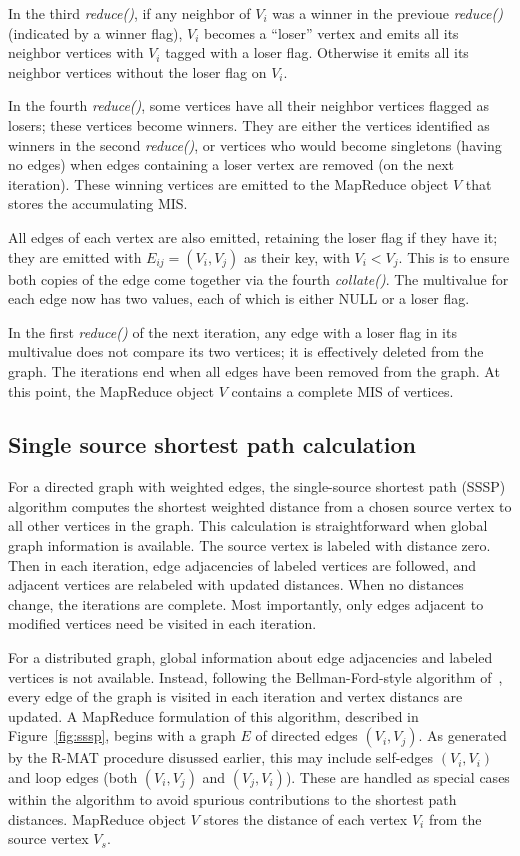 In the third {\it reduce()}, if any neighbor of $V_i$ was a winner in
the previoue {\it reduce()} (indicated by a winner flag), $V_i$
becomes a ``loser'' vertex and emits all its neighbor vertices with
$V_i$ tagged with a loser flag.  Otherwise it emits all its neighbor
vertices without the loser flag on $V_i$.

In the fourth {\it reduce()}, some vertices have all their neighbor
vertices flagged as losers; these vertices become winners.  They are
either the vertices identified as winners in the second {\it
reduce()}, or vertices who would become singletons (having no edges)
when edges containing a loser vertex are removed (on the next
iteration).  These winning vertices are emitted to the MapReduce
object $V$ that stores the accumulating MIS.

All edges of each vertex are also emitted, retaining the loser flag if
they have it; they are emitted with $E_{ij} = (V_i, V_j)$ as their
key, with $V_i < V_j$.  This is to ensure both copies of the edge come
together via the fourth {\it collate()}.  The multivalue for each edge
now has two values, each of which is either NULL or a loser flag.

In the first {\it reduce()} of the next iteration, any edge with a
loser flag in its multivalue does not compare its two vertices; it is
effectively deleted from the graph.  The iterations end when all edges
have been removed from the graph.  At this point, the MapReduce object
$V$ contains a complete MIS of vertices.

\subsection{Single source shortest path calculation}

For a directed graph with weighted edges, the single-source shortest
path (SSSP) algorithm computes the shortest weighted distance from a
chosen source vertex to all other vertices in the graph.  This
calculation is straightforward when global graph information is
available.  The source vertex is labeled with distance zero.  Then in
each iteration, edge adjacencies of labeled vertices are followed, and
adjacent vertices are relabeled with updated distances.  When no
distances change, the iterations are complete.  Most importantly, only
edges adjacent to modified vertices need be visited in each iteration.

For a distributed graph, global information about edge adjacencies and
labeled vertices is not available.  Instead, following the
Bellman-Ford-style algorithm of~\cite{SSSPMapReduce, Bellman58,
Ford62}, every edge of the graph is visited in each iteration and
vertex distancs are updated.  A MapReduce formulation of this
algorithm, described in Figure~\ref{fig:sssp}, begins with a graph $E$
of directed edges $(V_i,V_j)$.  As generated by the R-MAT procedure
disussed earlier, this may include self-edges $(V_i,V_i)$ and loop
edges (both $(V_i,V_j)$ and $(V_j,V_i)$).  These are handled as
special cases within the algorithm to avoid spurious contributions to
the shortest path distances.  MapReduce object $V$ stores the distance
of each vertex $V_i$ from the source vertex $V_s$.

